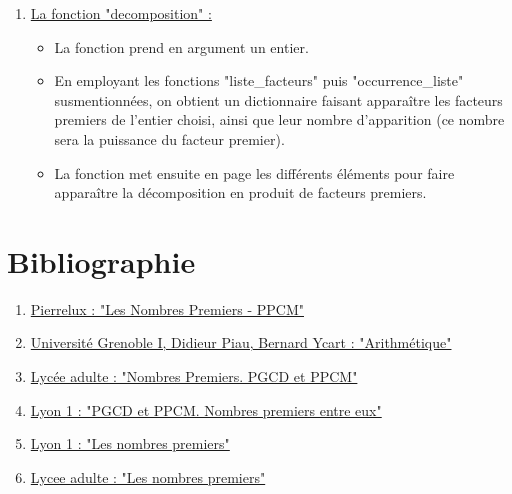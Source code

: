 \documentclass[titlepage]{article}
\begin{document}
\begin{enumerate}
\medskip
\item \underline{La fonction "decomposition" :}
\medskip 

	\begin{itemize}
	\item La fonction prend en argument un entier.
	\item En employant les fonctions "liste\_facteurs" puis "occurrence\_liste" susmentionnées, on obtient un dictionnaire faisant apparaître les facteurs premiers de l'entier choisi, ainsi que leur nombre d'apparition (ce nombre sera la puissance du facteur premier).
	\item La fonction met ensuite en page les différents éléments pour faire apparaître la décomposition en produit de facteurs premiers.
	\end{itemize}
\end{enumerate}



   
\section{Bibliographie}
\begin{enumerate}
\item \href{http://pierrelux.net/documents/cours/ts/premiers_ppcm.pdf}{Pierrelux : "Les Nombres Premiers - PPCM"}
\item \href{http://licence-math.univ-lyon1.fr/lib/exe/fetch.php?media=p13:algii:1-arith.pdf}{Université Grenoble I, Didieur Piau, Bernard Ycart : "Arithmétique"}
\item \href{https://www.lyceedadultes.fr/sitepedagogique/documents/math/mathCRPEcours/09_crpe_nombres_premiers_pgcd_et_ppcm.pdf}{Lycée adulte : "Nombres Premiers. PGCD et PPCM"}
\item \href{http://math.univ-lyon1.fr/capes/IMG/pdf/new.pgcd.pdf}{Lyon 1 : "PGCD et PPCM. Nombres premiers entre eux"}
\item \href{http://math.univ-lyon1.fr/capes/IMG/pdf/new.premier.pdf}{Lyon 1 : "Les nombres premiers"}
\item \href{https://www.lyceedadultes.fr/sitepedagogique/documents/math/mathTermSspe/03_Nombres_premiers/03_cours_les_nombres_premiers.pdf}{Lycee adulte : "Les nombres premiers"}
\end{enumerate}
\end{document}
